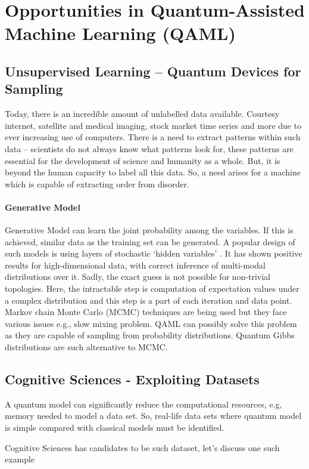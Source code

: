 \section{Opportunities in Quantum-Assisted Machine Learning (QAML)}
\subsection{Unsupervised Learning -- Quantum Devices for Sampling}
Today, there is an incredible amount of unlabelled data available. Courtesy internet, satellite and medical imaging, stock market time series and more due to ever increasing use of computers. There is a need to extract patterns within such data -- scientists do not always know what patterns look for, these patterns are essential for the development of science and humanity as a whole. But, it is beyond the human capacity to label all this data. So, a need arises for a machine which is capable of extracting order from disorder.

\paragraph{Generative Model}  Generative Model can learn the joint probability among the variables. If this is achieved, similar data as the training set can be generated. A popular design of such models is using layers of stochastic `hidden variables' . It has shown positive results for high-dimensional data, with correct inference of multi-modal distributions over it. Sadly, the exact guess is not possible for non-trivial topologies. Here, the intractable step is computation of expectation values under a complex distribution and this step is a part of each iteration and data point. Markov chain Monte Carlo (MCMC) techniques are being used but they face various issues e.g., slow mixing problem. QAML can possibly solve this problem as they are capable of sampling from probability distributions. Quantum Gibbs distributions are such alternative to MCMC.

\subsection{Cognitive Sciences - Exploiting Datasets}
A quantum model can significantly reduce the computational resources, e.g, memory needed to model a data set. So, real-life data sets where quantum model is simple compared with classical models must be identified. 

Cognitive Sciences has candidates to be such dataset, let's discuss one such example
